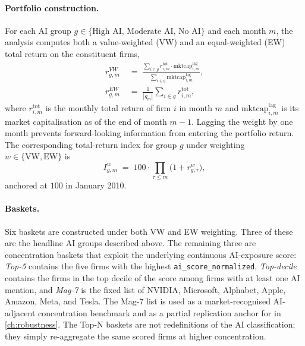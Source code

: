 \paragraph{Portfolio construction.} For each AI group $g \in \{\text{High AI},\,\text{Moderate AI},\,\text{No AI}\}$ and each month $m$, the analysis computes both a value-weighted (VW) and an equal-weighted (EW) total return on the constituent firms,
\begin{align}
    r^{VW}_{g,m} \;&=\; \frac{\sum_{i \in g} r^{\text{tot}}_{i,m} \cdot \text{mktcap}^{\text{lag}}_{i,m}}{\sum_{i \in g} \text{mktcap}^{\text{lag}}_{i,m}},
        \label{eq:vw-portfolio} \\
    r^{EW}_{g,m} \;&=\; \frac{1}{|g_m|} \sum_{i \in g} r^{\text{tot}}_{i,m},
        \label{eq:ew-portfolio}
\end{align}
where $r^{\text{tot}}_{i,m}$ is the monthly total return of firm $i$ in month $m$ and $\text{mktcap}^{\text{lag}}_{i,m}$ is its market capitalisation as of the end of month $m-1$. Lagging the weight by one month prevents forward-looking information from entering the portfolio return. The corresponding total-return index for group $g$ under weighting $w \in \{\text{VW},\text{EW}\}$ is
\begin{equation}
    I^{w}_{g,m} \;=\; 100 \cdot \prod_{\tau \leq m} \big(1 + r^{w}_{g,\tau}\big),
    \label{eq:tr-index}
\end{equation}
anchored at $100$ in January 2010.

\paragraph{Baskets.} Six baskets are constructed under both VW and EW weighting. Three of these are the headline AI groups described above. The remaining three are concentration baskets that exploit the underlying continuous AI-exposure score: \emph{Top-5} contains the five firms with the highest \texttt{ai\_score\_normalized}, \emph{Top-decile} contains the firms in the top decile of the score among firms with at least one AI mention, and \emph{Mag-7} is the fixed list of NVIDIA, Microsoft, Alphabet, Apple, Amazon, Meta, and Tesla. The Mag-7 list is used as a market-recognised AI-adjacent concentration benchmark and as a partial replication anchor for \citet{baselePhillipsShi2025} in \cref{ch:robustness}. The Top-N baskets are not redefinitions of the AI classification; they simply re-aggregate the same scored firms at higher concentration.

